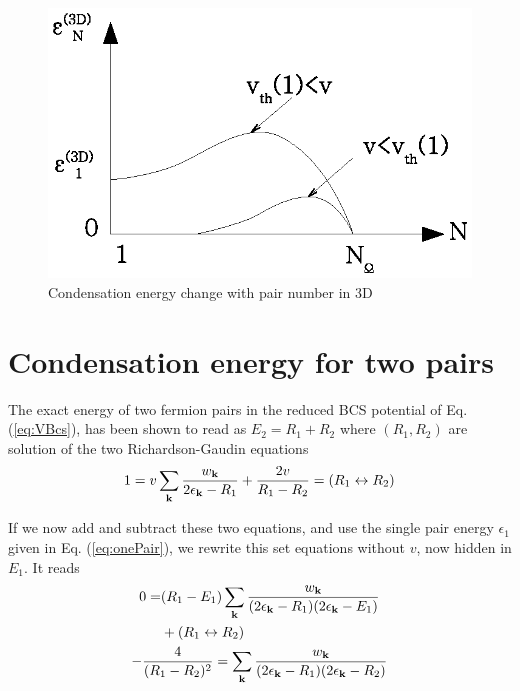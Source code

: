 \documentclass[3p,twocolumn]{elsarticle}
\begin{document}
\begin{figure}[htb]
	\centering
		\includegraphics[width=0.8\columnwidth]{3dCondChange.eps}
	\caption{Condensation energy change with pair number  in 3D}
	\label{fig:3dCondChange}
\end{figure}

\section{Condensation energy for two pairs\label{sec:twoPair}}
The exact energy of two fermion pairs in the reduced BCS potential of Eq. (\ref{eq:VBcs}), has been shown to read as $E_2=R_1+R_2$ where $(R_1,R_2)$ are solution of the two Richardson-Gaudin equations
\begin{equation}
1=v\sum_{\mathbf{k}}\frac{w_{\mathbf{k}}}{2\epsilon_{\mathbf{k}}-R_1}+\frac{2v}{R_1-R_2}=(R_{1}\leftrightarrow{}R_{2})
\label{eq:richardsonEq}
\end{equation}

If we now add and subtract these two equations, and use the single pair energy $\epsilon_{1}$ given in  Eq. (\ref{eq:onePair}), we rewrite this set equations without $v$, now hidden in $E_{1}$.  It reads 
\begin{gather}
\begin{split}
0=&(R_1-E_1)\sum_{\mathbf{k}}\frac{w_{\mathbf{k}}}{(2\epsilon_{\mathbf{k}}-R_1)(2\epsilon_{\mathbf{k}}-E_1)}\\
&+(R_{1}\leftrightarrow{}R_{2})\label{eq:2PairPlus}
\end{split}\\
-\frac{4}{(R_1-R_2)^2}=\sum_{\mathbf{k}}\frac{w_{\mathbf{k}}}{(2\epsilon_{\mathbf{k}}-R_1)(2\epsilon_{\mathbf{k}}-R_2)}\label{eq:2PairMinus}
\end{gather}
\end{document}
